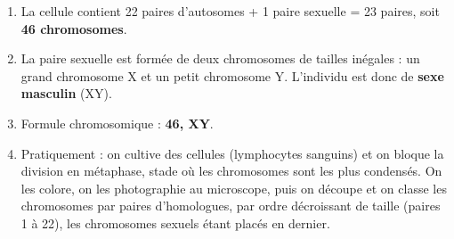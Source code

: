 \documentclass[11pt]{article}
\begin{document}
\begin{corrige}
\begin{enumerate}
\item La cellule contient 22 paires d'autosomes + 1 paire sexuelle = 23 paires, soit \textbf{46 chromosomes}.
\item La paire sexuelle est formée de deux chromosomes de tailles inégales : un grand chromosome X et un petit chromosome Y. L'individu est donc de \textbf{sexe masculin} (XY).
\item Formule chromosomique : \textbf{46, XY}.
\item Pratiquement : on cultive des cellules (lymphocytes sanguins) et on bloque la division en métaphase, stade où les chromosomes sont les plus condensés. On les colore, on les photographie au microscope, puis on découpe et on classe les chromosomes par paires d'homologues, par ordre décroissant de taille (paires 1 à 22), les chromosomes sexuels étant placés en dernier.
\end{enumerate}
\end{corrige}
\end{document}
